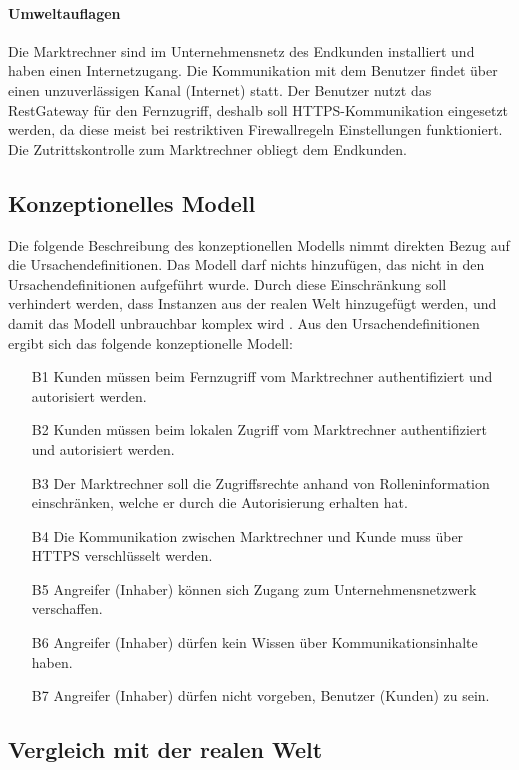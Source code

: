 \documentclass[11pt,a4paper]{report}
\begin{document}
\paragraph{Umweltauflagen} Die Marktrechner sind im Unternehmensnetz des Endkunden installiert und haben einen Internetzugang. Die Kommunikation mit dem Benutzer findet über einen unzuverlässigen Kanal (Internet) statt. Der Benutzer nutzt das RestGateway für den Fernzugriff, deshalb soll HTTPS-Kommunikation eingesetzt werden, da diese meist bei restriktiven Firewallregeln Einstellungen funktioniert. Die Zutrittskontrolle zum Marktrechner obliegt dem Endkunden.

\subsection{Konzeptionelles Modell}

Die folgende Beschreibung des konzeptionellen Modells nimmt direkten Bezug auf die Ursachendefinitionen. Das Modell darf nichts hinzufügen, das nicht in den Ursachendefinitionen aufgeführt wurde. Durch diese Einschränkung soll verhindert werden, dass Instanzen aus der realen Welt hinzugefügt werden, und damit das Modell unbrauchbar komplex wird \cite[s.~256]{gutmann}. Aus den Ursachendefinitionen ergibt sich das folgende konzeptionelle Modell:

\begin{enumerate}[leftmargin=*]
\item[B1] Kunden müssen beim Fernzugriff vom Marktrechner authentifiziert und autorisiert werden.
\item[B2] Kunden müssen beim lokalen Zugriff vom Marktrechner authentifiziert und autorisiert werden.
\item[B3] Der Marktrechner soll die Zugriffsrechte anhand von Rolleninformation einschränken, welche er durch die Autorisierung erhalten hat.
\item[B4] Die Kommunikation zwischen Marktrechner und Kunde muss über HTTPS verschlüsselt werden.
\item[B5] Angreifer (Inhaber) können sich Zugang zum Unternehmensnetzwerk verschaffen.
\item[B6] Angreifer (Inhaber) dürfen kein Wissen über Kommunikationsinhalte haben.
\item[B7] Angreifer (Inhaber) dürfen nicht vorgeben, Benutzer (Kunden) zu sein.
\end{enumerate}

\subsection{Vergleich mit der realen Welt}
\end{document}
